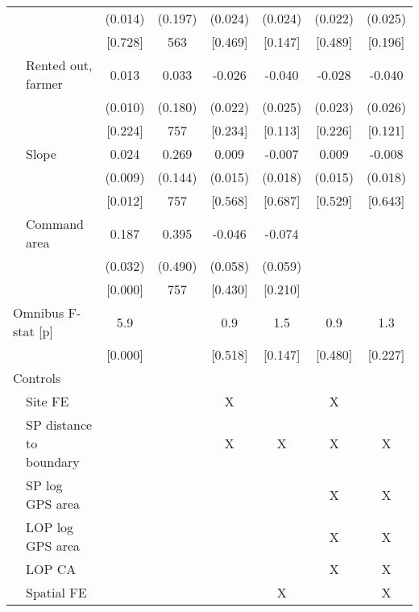 \begin{tabular}{llcccccc}
 & & (0.014) & (0.197) & (0.024) & (0.024) & (0.022) & (0.025) \\
 & & [0.728] & 563 & [0.469] & [0.147] & [0.489] & [0.196] \\[0.5em]
 & Rented out, farmer & 0.013 & 0.033 & -0.026 & -0.040 & -0.028 & -0.040 \\
 & & (0.010) & (0.180) & (0.022) & (0.025) & (0.023) & (0.026) \\
 & & [0.224] & 757 & [0.234] & [0.113] & [0.226] & [0.121] \\[0.5em]
 & Slope & 0.024 & 0.269 & 0.009 & -0.007 & 0.009 & -0.008 \\
 & & (0.009) & (0.144) & (0.015) & (0.018) & (0.015) & (0.018) \\
 & & [0.012] & 757 & [0.568] & [0.687] & [0.529] & [0.643] \\[0.5em]
 & Command area & 0.187 & 0.395 & -0.046 & -0.074 &  &  \\
 & & (0.032) & (0.490) & (0.058) & (0.059) &  &  \\
 & & [0.000] & 757 & [0.430] & [0.210] &  &  \\[0.5em]
\multicolumn{2}{l}{Omnibus F-stat [p]} & 5.9 &  & 0.9 & 1.5 & 0.9 & 1.3 \\
&  & [0.000] &  & [0.518] & [0.147] & [0.480] & [0.227] \\[0.5em]
\hline
\multicolumn{2}{l}{Controls} & & & & & & \\
\cmidrule(lr){1-2}
 & Site FE &  &  & X &  & X &  \\
 & SP distance to boundary &  &  & X & X & X & X \\
 & SP log GPS area &  &  &  &  & X & X \\
 & LOP log GPS area &  &  &  &  & X & X \\
 & LOP CA &  &  &  &  & X & X \\
 & Spatial FE &  &  &  & X &  & X \\
\hline
\end{tabular}
